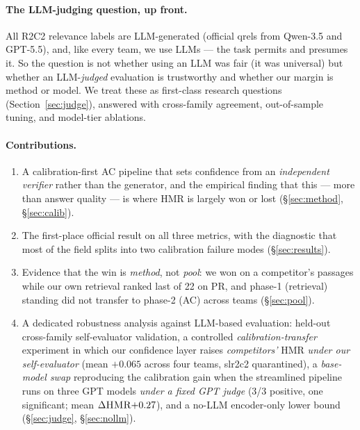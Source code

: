 \documentclass[sigconf,nonacm]{acmart}
\newcommand{\HMR}{\textsc{HMR}}
\begin{document}
\paragraph{The LLM-judging question, up front.} All R2C2 relevance labels are LLM-generated
(official qrels from Qwen-3.5 and GPT-5.5), and, like every team, we use LLMs --- the task
permits and presumes it. So the question is not whether using an LLM was fair (it was
universal) but whether an LLM-\emph{judged} evaluation is trustworthy and whether our margin
is method or model. We treat these as first-class research questions
(Section~\ref{sec:judge}), answered with cross-family agreement, out-of-sample tuning, and
model-tier ablations.

\paragraph{Contributions.}
\begin{enumerate}
  \item A calibration-first AC pipeline that sets confidence from an \emph{independent
    verifier} rather than the generator, and the empirical finding that this --- more
    than answer quality --- is where \HMR{} is largely won or lost (\S\ref{sec:method},
    \S\ref{sec:calib}).
  \item The first-place official result on all three metrics, with the diagnostic that
    most of the field splits into two calibration failure modes (\S\ref{sec:results}).
  \item Evidence that the win is \emph{method}, not \emph{pool}: we won on a competitor's
    passages while our own retrieval ranked last of 22 on PR, and phase-1 (retrieval)
    standing did not transfer to phase-2 (AC) across teams (\S\ref{sec:pool}).
  \item A dedicated robustness analysis against LLM-based evaluation: held-out cross-family
    self-evaluator validation, a controlled \emph{calibration-transfer} experiment in which
    our confidence layer raises \emph{competitors'} \HMR{} \emph{under our self-evaluator}
    (mean $+0.065$ across four teams, slr2c2 quarantined), a \emph{base-model swap}
    reproducing the calibration gain when the streamlined pipeline runs on three GPT models
    \emph{under a fixed GPT judge} (3/3 positive, one significant; mean $\Delta\HMR{+}0.27$),
    and a no-LLM encoder-only lower bound (\S\ref{sec:judge}, \S\ref{sec:nollm}).
\end{enumerate}
\end{document}
